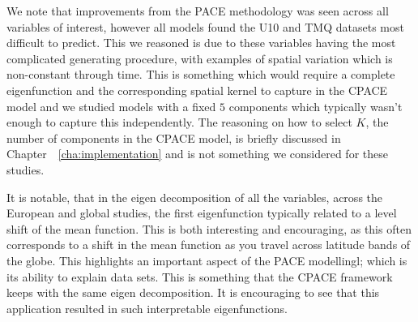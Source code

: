 We note that improvements from the PACE methodology was seen across all variables of interest, however all models found the U10 and TMQ datasets most difficult to predict.
This we reasoned is due to these variables having the most complicated generating procedure, with examples of spatial variation which is non-constant through time.
This is something which would require a complete eigenfunction and the corresponding spatial kernel to capture in the CPACE model and we studied models with a fixed $5$ components which typically wasn't enough to capture this independently. 
The reasoning on how to select $K$, the number of components in the CPACE model, is briefly discussed in Chapter~~\ref{cha:implementation} and is not something we considered for these studies.

It is notable, that in the eigen decomposition of all the variables, across the European and global studies, the first eigenfunction typically related to a level shift of the mean function.
This is both interesting and encouraging, as this often corresponds to a shift in the mean function as you travel across latitude bands of the globe.
This highlights an important aspect of the PACE modellingl; which is its ability to explain data sets.
This is something that the CPACE framework keeps with the same eigen decomposition. 
It is encouraging to see that this application resulted in such interpretable eigenfunctions.